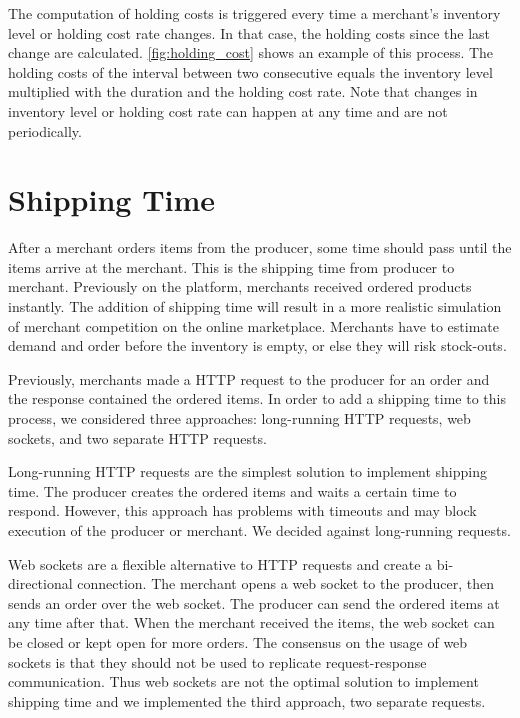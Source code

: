 The computation of holding costs is triggered every time a merchant's inventory level or holding cost rate changes.
In that case, the holding costs since the last change are calculated.
\cref{fig:holding_cost} shows an example of this process.
The holding costs of the interval between two consecutive equals the inventory level multiplied with the duration and the holding cost rate.
Note that changes in inventory level or holding cost rate can happen at any time and are not periodically.

\section{Shipping Time}
\label{section:shipping_time}
After a merchant orders items from the producer, some time should pass until the items arrive at the merchant.
This is the shipping time from producer to merchant.
Previously on the \pricewars platform, merchants received ordered products instantly.
The addition of shipping time will result in a more realistic simulation of merchant competition on the online marketplace.
Merchants have to estimate demand and order before the inventory is empty, or else they will risk stock-outs.

Previously, merchants made a HTTP request to the producer for an order and the response contained the ordered items.
In order to add a shipping time to this process, we considered three approaches: long-running HTTP requests, web sockets, and two separate HTTP requests. 

Long-running HTTP requests are the simplest solution to implement shipping time.
The producer creates the ordered items and waits a certain time to respond.
However, this approach has problems with timeouts and may block execution of the producer or merchant.
We decided against long-running requests.

Web sockets are a flexible alternative to HTTP requests and create a bi-directional connection.
The merchant opens a web socket to the producer, then sends an order over the web socket.
The producer can send the ordered items at any time after that.
When the merchant received the items, the web socket can be closed or kept open for more orders.
The consensus on the usage of web sockets is that they should not be used to replicate request-response communication.
Thus web sockets are not the optimal solution to implement shipping time and we implemented the third approach, two separate requests.

